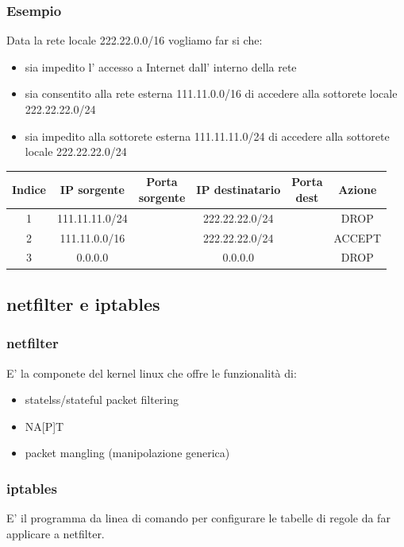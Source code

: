 \subsubsection{Esempio}
Data la rete locale 222.22.0.0/16 vogliamo far si che:
\begin{itemize}
    \item sia impedito l' accesso a Internet dall' interno della rete
    \item sia consentito alla rete esterna 111.11.0.0/16 di accedere alla sottorete locale 222.22.22.0/24
    \item sia impedito alla sottorete esterna 111.11.11.0/24 di accedere alla sottorete locale 222.22.22.0/24
\end{itemize}
\begin{table}[ht!]
    \centering
    \begin{tabular}{c|c|c|c|c|c}
        Indice & IP sorgente & \thead{Porta \\ sorgente} & IP destinatario & \thead{Porta \\ dest} & Azione  \\
        \hline
        1 & 111.11.11.0/24 & & 222.22.22.0/24 & & DROP \\
        2 & 111.11.0.0/16 & & 222.22.22.0/24 & & ACCEPT \\
        3 & 0.0.0.0 & & 0.0.0.0 & & DROP \\
    \end{tabular}
\end{table}

\subsection{netfilter e iptables}
\subsubsection{netfilter}
E' la componete del kernel linux che offre le funzionalità di:
\begin{itemize}
    \item statelss/stateful packet filtering
    \item NA[P]T
    \item packet mangling (manipolazione generica)
\end{itemize}

\subsubsection{iptables}
E' il programma da linea di comando per configurare le tabelle di regole da far applicare a netfilter.

